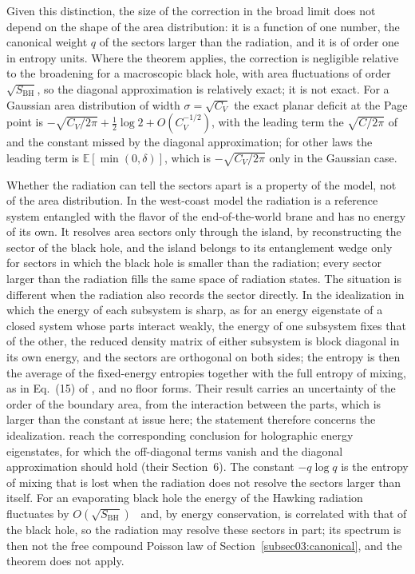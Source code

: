 \documentclass[11pt,letterpaper]{article}
\theoremstyle{plain}
\theoremstyle{definition}
\theoremstyle{remark}
\begin{document}
Given this distinction, the size of the correction in the broad limit does not depend on the shape of the area distribution: it is a function of one number, the canonical weight $q$ of the sectors larger than the radiation, and it is of order one in entropy units. Where the theorem applies, the correction is negligible relative to the broadening for a macroscopic black hole, with area fluctuations of order $\sqrt{S_{\mathrm{BH}}}$, so the diagonal approximation is relatively exact; it is not exact. For a Gaussian area distribution of width $\sigma = \sqrt{C_V}$ the exact planar deficit at the Page point is $-\sqrt{C_V/2\pi} + \tfrac12\log 2 + O(C_V^{-1/2})$, with the leading term the $\sqrt{C/2\pi}$ of \citet{murthysrednicki2019} and the constant missed by the diagonal approximation; for other laws the leading term is $\mathbb{E}[\min(0,\delta)]$, which is $-\sqrt{C_V/2\pi}$ only in the Gaussian case.

Whether the radiation can tell the sectors apart is a property of the model, not of the area distribution. In the west-coast model the radiation is a reference system entangled with the flavor of the end-of-the-world brane and has no energy of its own. It resolves area sectors only through the island, by reconstructing the sector of the black hole, and the island belongs to its entanglement wedge only for sectors in which the black hole is smaller than the radiation; every sector larger than the radiation fills the same space of radiation states. The situation is different when the radiation also records the sector directly. In the idealization in which the energy of each subsystem is sharp, as for an energy eigenstate of a closed system whose parts interact weakly, the energy of one subsystem fixes that of the other, the reduced density matrix of either subsystem is block diagonal in its own energy, and the sectors are orthogonal on both sides; the entropy is then the average of the fixed-energy entropies together with the full entropy of mixing, as in Eq.~(15) of \citet{murthysrednicki2019}, and no floor forms. Their result carries an uncertainty of the order of the boundary area, from the interaction between the parts, which is larger than the constant at issue here; the statement therefore concerns the idealization. \citet{marolfwangwang2020} reach the corresponding conclusion for holographic energy eigenstates, for which the off-diagonal terms vanish and the diagonal approximation should hold (their Section~6). The constant $-q\log q$ is the entropy of mixing that is lost when the radiation does not resolve the sectors larger than itself. For an evaporating black hole the energy of the Hawking radiation fluctuates by $O(\sqrt{S_{\mathrm{BH}}})$~\citep{penington2020} and, by energy conservation, is correlated with that of the black hole, so the radiation may resolve these sectors in part;
 its spectrum is then not the free compound Poisson law of Section~\ref{subsec03:canonical}, and the theorem does not apply.
\end{document}
